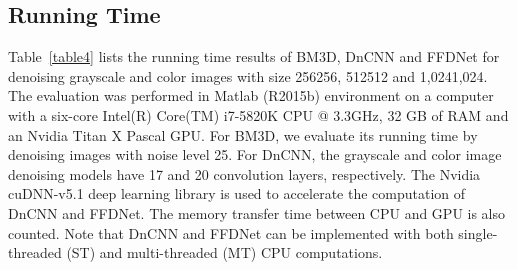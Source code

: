 \documentclass[journal]{IEEEtran}
\begin{document}
\subsection{Running Time}\label{section_runtime}

Table~\ref{table4} lists the running time results of BM3D, DnCNN and FFDNet for denoising grayscale and color images with size 256256, 512512 and 1,0241,024.
The evaluation was performed in Matlab (R2015b) environment on a computer with a six-core Intel(R) Core(TM) i7-5820K CPU @ 3.3GHz, 32 GB of RAM and an Nvidia Titan X Pascal GPU.
For BM3D, we evaluate its running time by denoising images with noise level 25. For DnCNN, the grayscale and color image denoising models have 17 and 20 convolution layers, respectively.
The Nvidia cuDNN-v5.1 deep learning library is used to accelerate the computation of DnCNN and FFDNet. The memory transfer time between CPU and GPU is also counted. Note that DnCNN and FFDNet can be implemented
with both single-threaded (ST) and multi-threaded (MT) CPU computations.
\end{document}
